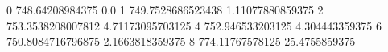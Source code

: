 0 748.64208984375 0.0
1 749.7528686523438 1.11077880859375
2 753.3538208007812 4.71173095703125
4 752.946533203125 4.304443359375
6 750.8084716796875 2.1663818359375
8 774.11767578125 25.4755859375
